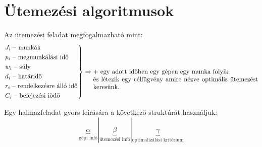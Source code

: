\skiptooddpage%
\section{Ütemezési algoritmusok}

Az ütemezési feladat megfogalmazható mint:
\[
	\begin{rcases}
		J_i \mbox{ -- munkák}                 \\
		p_i \mbox{ -- megmunkálási idő}       \\
		w_i \mbox{ -- súly}                   \\
		d_i \mbox{ -- határidő}               \\
		r_i \mbox{ -- rendelkezésre álló idő} \\
		C_i \mbox{ -- befejezési iödő}        \\
	\end{rcases}
	\Rightarrow
	\parbox[t]{9cm}{ $+$ egy adott időben egy gépen egy munka folyik \\
	és létezik egy célfügvény amire nézve optimális ütemezést keresünk.}
\]

Egy halmazfeladat gyors leírására a következő struktúrát használjuk:
\[
	\underbrace{\alpha}_{\mbox{gépi infó}} | \underbrace{\beta}_{\mbox{ütemezési infó}
	} | \underbrace{\gamma}_{\mbox{optimalizálási kritérium}}
\]

